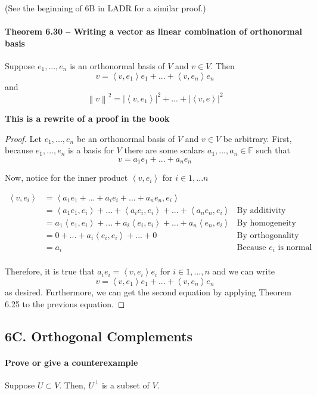 \documentclass{article}
\newcommand{\norm}[1]{\left\lVert#1\right\rVert}
\newcommand{\iprod}[2]{\left\langle#1,#2\right\rangle}
\newcommand{\abs}[1]{\left|#1\right|}
\begin{document}
(See the beginning of 6B in LADR for a similar proof.)

\paragraph{Theorem 6.30 -- Writing a vector as linear combination of orthonormal basis}
Suppose $e_1, ..., e_n$ is an orthonormal basis of $V$ and $v \in V$. Then
\[ v = \iprod{v}{e_1}e_1 +... + \iprod{v}{e_n}e_n \]
and
\[ \norm{v}^2 = \abs{\iprod{v}{e_1}}^2 + ... + \abs{\iprod{v}{e}}^2 \]

\textbf{This is a rewrite of a proof in the book}

\begin{proof}
    Let $e_1, ..., e_n$ be an orthonormal basis of $V$ and $v \in V$ be arbitrary. First, because $e_1, ..., e_n$ is a basis for $V$ there are some scalars $a_1, ..., a_n \in \mathbb{F}$ such that
    \[
        v = a_1e_1 + ... + a_ne_n 
    \]
    
    Now, notice for the inner product $\iprod{v}{e_i}$ for $i \in 1, ... n$
    
    \[\begin{aligned}
        \iprod{v}{e_i}
        &= \iprod{a_1e_1 + ... + a_ie_i + ... + a_ne_n}{e_i} \\
        &= \iprod{a_1e_1}{e_i} + ... + \iprod{a_ie_i}{e_i} + ... + \iprod{a_ne_n}{e_i} &\text{By additivity} \\
        &= a_1\iprod{e_1}{e_i} + ... + a_i\iprod{e_i}{e_i} + ... + a_n\iprod{e_n}{e_i} &\text{By homogeneity in the first slot} \\
        &= 0 + ... + a_i\iprod{e_i}{e_i} + ... + 0 &\text{By orthogonality} \\
        &= a_i &\text{Because $e_i$ is normal} \\
    \end{aligned}\]
    
    Therefore, it is true that $a_ie_i = \iprod{v}{e_i}{e_i}$ for $i \in 1, ..., n$ and we can write
    \[ v = \iprod{v}{e_1}e_1 + ... + \iprod{v}{e_n}e_n \]
    as desired. Furthermore, we can get the second equation by applying Theorem 6.25 to the previous equation.
\end{proof}

\subsection*{6C. Orthogonal Complements}
\paragraph{Prove or give a counterexample} Suppose $U \subset V$. Then, $U^\perp$ is a subset of $V$.
\end{document}
